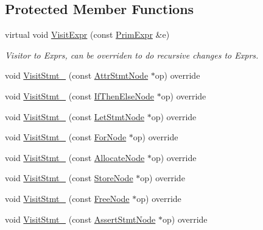 \subsection*{Protected Member Functions}
\begin{DoxyCompactItemize}
\item 
virtual void \hyperlink{classtvm_1_1tir_1_1StmtVisitor_a6d35a6081ee7dbc440e5a980f70795c6}{Visit\+Expr} (const \hyperlink{classtvm_1_1PrimExpr}{Prim\+Expr} \&e)
\begin{DoxyCompactList}\small\item\em Visitor to Exprs, can be overriden to do recursive changes to Exprs. \end{DoxyCompactList}\item 
void \hyperlink{classtvm_1_1tir_1_1StmtVisitor_a0e6ca99ff599eea59b322df49b1c3449}{Visit\+Stmt\+\_\+} (const \hyperlink{classtvm_1_1tir_1_1AttrStmtNode}{Attr\+Stmt\+Node} $\ast$op) override
\item 
void \hyperlink{classtvm_1_1tir_1_1StmtVisitor_a38488c0f8137e12bc195fa2e0a0524c9}{Visit\+Stmt\+\_\+} (const \hyperlink{classtvm_1_1tir_1_1IfThenElseNode}{If\+Then\+Else\+Node} $\ast$op) override
\item 
void \hyperlink{classtvm_1_1tir_1_1StmtVisitor_ad3334020eaa0a0fa20bb131020a1e09d}{Visit\+Stmt\+\_\+} (const \hyperlink{classtvm_1_1tir_1_1LetStmtNode}{Let\+Stmt\+Node} $\ast$op) override
\item 
void \hyperlink{classtvm_1_1tir_1_1StmtVisitor_a973300325d22158d8d7096ddc862b13e}{Visit\+Stmt\+\_\+} (const \hyperlink{classtvm_1_1tir_1_1ForNode}{For\+Node} $\ast$op) override
\item 
void \hyperlink{classtvm_1_1tir_1_1StmtVisitor_a8e8cdf15d6e250ae57ae1777048e99f8}{Visit\+Stmt\+\_\+} (const \hyperlink{classtvm_1_1tir_1_1AllocateNode}{Allocate\+Node} $\ast$op) override
\item 
void \hyperlink{classtvm_1_1tir_1_1StmtVisitor_afcb1a0ec03b7a7da4304c5b790b27210}{Visit\+Stmt\+\_\+} (const \hyperlink{classtvm_1_1tir_1_1StoreNode}{Store\+Node} $\ast$op) override
\item 
void \hyperlink{classtvm_1_1tir_1_1StmtVisitor_ac1fc9bc715f6b1dcba2bf3dd19619f3f}{Visit\+Stmt\+\_\+} (const \hyperlink{classtvm_1_1tir_1_1FreeNode}{Free\+Node} $\ast$op) override
\item 
void \hyperlink{classtvm_1_1tir_1_1StmtVisitor_a6cca1dd5ab6329207cecb8b94c63f8c2}{Visit\+Stmt\+\_\+} (const \hyperlink{classtvm_1_1tir_1_1AssertStmtNode}{Assert\+Stmt\+Node} $\ast$op) override
\item 

\end{DoxyCompactItemize}
